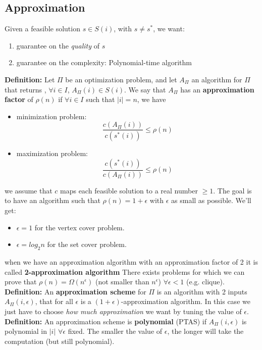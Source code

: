 \subsection{Approximation}
Given a feasible solution $s \in S(i)$, with $s \neq s^*$, we want:
\begin{enumerate}
    \item guarantee on the \textit{quality} of $s$
    \item guarantee on the complexity: Polynomial-time algorithm
\end{enumerate}
\textbf{Definition:} Let $\Pi$ be an optimization problem, and let $A_\Pi$ an algorithm for $\Pi$ that returns , $\forall i \in I$, $A_\Pi (i) \in S(i)$. We say that $A_\Pi$ has an \textbf{approximation factor} of $\rho(n)$ if $\forall i \in I$ such that $|i| = n$, we have 
\begin{itemize}
    \item minimization problem:
    \[\frac{c(A_\Pi(i))}{c(s^*(i))} \leq \rho(n)\]

    \item maximization problem:
    \[\frac{c(s^*(i))}{c(A_\Pi(i))} \leq \rho(n)\]
\end{itemize}
we assume that $c$ maps each feasible solution to a real number $\geq 1$.\newline\newline
The goal is to have an algorithm such that $\rho(n) = 1 + \epsilon$ with $\epsilon$ as small as possible. We'll get:
\begin{itemize}
    \item $\epsilon = 1$ for the vertex cover problem.
    \item $\epsilon = log_2n$ for the set cover problem. 
\end{itemize}
when we have an approximation algorithm with an approximation factor of 2 it is called \textbf{2-approximation algorithm}\newline\newline
There exists problems for which we can prove that $\rho(n) = \Omega(n^\epsilon)$ (not smaller than $n^\epsilon$) $\forall \epsilon < 1$ (e.g. clique).\newline\newline
\textbf{Definition:} An \textbf{approximation scheme} for $\Pi$ is an algorithm with 2 inputs $A_\Pi(i, \epsilon)$, that for all $\epsilon$ is a $(1 + \epsilon)$-approximation algorithm. In this case we just have to choose \textit{how much approximation} we want by tuning the value of $\epsilon$.\newline\newline
\textbf{Definition:} An approximation scheme is \textbf{polynomial} (PTAS) if $A_\Pi(i, \epsilon)$ is polynomial in $|i| \,\, \forall \epsilon$ fixed. The smaller the value of $\epsilon$, the longer will take the computation (but still polynomial).

